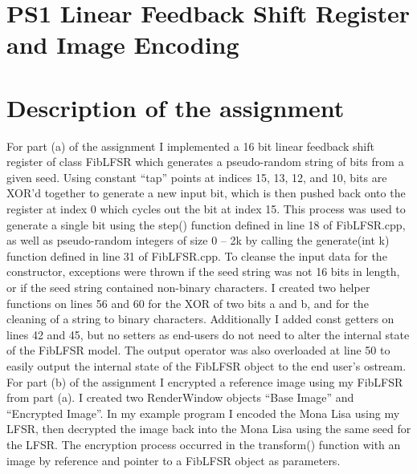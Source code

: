 \documentclass[12pt]{article}
\begin{document}
\section*{PS1 Linear Feedback Shift Register and Image Encoding}
\section[1]{Description of the assignment}
\hfill\begin{minipage}{\dimexpr\textwidth-1cm}
For part (a) of the assignment I implemented a 16 bit linear feedback shift register of class FibLFSR which generates a pseudo-random string of bits from a given seed. Using constant “tap” points at indices 15, 13, 12, and 10, bits are XOR’d together to generate a new input bit, which is then pushed back onto the register at index 0 which cycles out the bit at index 15. This process was used to generate a single bit using the step() function defined in line 18 of FibLFSR.cpp, as well as pseudo-random integers of size 0 – 2k by calling the generate(int k) function defined in line 31 of FibLFSR.cpp. To cleanse the input data for the constructor, exceptions were thrown if the seed string was not 16 bits in length, or if the seed string contained non-binary characters. \newline
I created two helper functions on lines 56 and 60 for the XOR of two bits a and b, and for the cleaning of a string to binary characters. Additionally I added const getters on lines 42 and 45, but no setters as end-users do not need to alter the internal state of the FibLFSR model. The output operator was also overloaded at line 50 to easily output the internal state of the FibLFSR object to the end user’s ostream. \newline
\newline
For part (b) of the assignment I encrypted a reference image using my FibLFSR from part (a). I created two RenderWindow objects “Base Image” and “Encrypted Image”. In my example program I encoded the Mona Lisa using my LFSR, then decrypted the image back into the Mona Lisa using the same seed for the LFSR. The encryption process occurred in the transform() function with an image by reference and pointer to a FibLFSR object as parameters.
\end{minipage}
\end{document}
